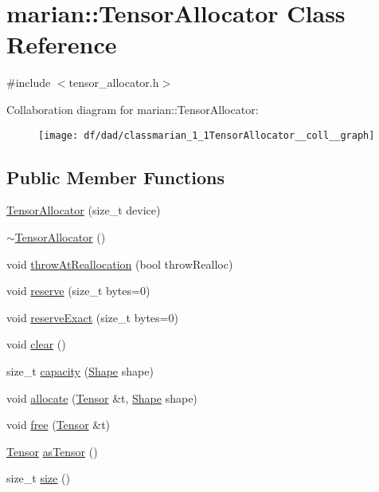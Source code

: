 \hypertarget{classmarian_1_1TensorAllocator}{}\section{marian\+:\+:Tensor\+Allocator Class Reference}
\label{classmarian_1_1TensorAllocator}


{\ttfamily \#include $<$tensor\+\_\+allocator.\+h$>$}



Collaboration diagram for marian\+:\+:Tensor\+Allocator\+:
\nopagebreak
\begin{figure}[H]
\begin{center}
\leavevmode
\texttt{[image: df/dad/classmarian\_1\_1TensorAllocator\_\_coll\_\_graph]}
\end{center}
\end{figure}
\subsection*{Public Member Functions}
\begin{DoxyCompactItemize}
\item 
\hyperlink{classmarian_1_1TensorAllocator_a2f03fd2af1e841452bdd987fbdd1a99b}{Tensor\+Allocator} (size\+\_\+t device)
\item 
\hyperlink{classmarian_1_1TensorAllocator_a9c29d993bcd9c68292df2b6f8d0f3aa8}{$\sim$\+Tensor\+Allocator} ()
\item 
void \hyperlink{classmarian_1_1TensorAllocator_abea1f9334979c6ffa5e01b9fd30c33d8}{throw\+At\+Reallocation} (bool throw\+Realloc)
\item 
void \hyperlink{classmarian_1_1TensorAllocator_a108f43553dde1508f4e835ed8d90d5b7}{reserve} (size\+\_\+t bytes=0)
\item 
void \hyperlink{classmarian_1_1TensorAllocator_a3586fcca88cae8c80ebc7ce1b7b4d76c}{reserve\+Exact} (size\+\_\+t bytes=0)
\item 
void \hyperlink{classmarian_1_1TensorAllocator_aacd475130da9dc8dfcceddae324122c8}{clear} ()
\item 
size\+\_\+t \hyperlink{classmarian_1_1TensorAllocator_a72534a67e125523fc97edec3dbe6597f}{capacity} (\hyperlink{structmarian_1_1Shape}{Shape} shape)
\item 
void \hyperlink{classmarian_1_1TensorAllocator_ac5ecda49dde41d94952298ce9c33ef5f}{allocate} (\hyperlink{namespacemarian_a88b71ec34bb354564cddc24eb80f7e14}{Tensor} \&t, \hyperlink{structmarian_1_1Shape}{Shape} shape)
\item 
void \hyperlink{classmarian_1_1TensorAllocator_a53a59558f7849713f76ec373e82ddae2}{free} (\hyperlink{namespacemarian_a88b71ec34bb354564cddc24eb80f7e14}{Tensor} \&t)
\item 
\hyperlink{namespacemarian_a88b71ec34bb354564cddc24eb80f7e14}{Tensor} \hyperlink{classmarian_1_1TensorAllocator_ab3045ee0699ca705168a0db409450120}{as\+Tensor} ()
\item 
size\+\_\+t \hyperlink{classmarian_1_1TensorAllocator_a943d693eaab5cfe7fc16b009f2c219af}{size} ()
\end{DoxyCompactItemize}
